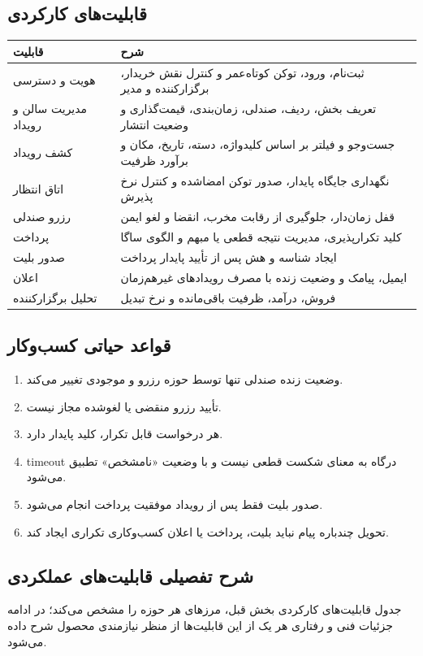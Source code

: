 \documentclass[12pt,a4paper]{article}
\newcommand{\term}[1]{\lr{#1}}
\begin{document}
\subsection{قابلیت‌های کارکردی}
\begin{center}
\begin{tabular}{P{3.3cm}P{10.8cm}}
\toprule
قابلیت & شرح\\
\midrule
هویت و دسترسی & ثبت‌نام، ورود، توکن کوتاه‌عمر و کنترل نقش خریدار، برگزارکننده و مدیر\\
مدیریت سالن و رویداد & تعریف بخش، ردیف، صندلی، زمان‌بندی، قیمت‌گذاری و وضعیت انتشار\\
کشف رویداد & جست‌وجو و فیلتر بر اساس کلیدواژه، دسته، تاریخ، مکان و برآورد ظرفیت\\
اتاق انتظار & نگهداری جایگاه پایدار، صدور توکن امضاشده و کنترل نرخ پذیرش\\
رزرو صندلی & قفل زمان‌دار، جلوگیری از رقابت مخرب، انقضا و لغو ایمن\\
پرداخت & کلید تکرارپذیری، مدیریت نتیجه قطعی یا مبهم و الگوی ساگا\\
صدور بلیت & ایجاد شناسه و هش \term{QR} پس از تأیید پایدار پرداخت\\
اعلان & ایمیل، پیامک و وضعیت زنده با مصرف رویدادهای غیرهم‌زمان\\
تحلیل برگزارکننده & فروش، درآمد، ظرفیت باقی‌مانده و نرخ تبدیل\\
\bottomrule
\end{tabular}
\end{center}

\subsection{قواعد حیاتی کسب‌وکار}
\begin{enumerate}
  \item وضعیت زنده صندلی تنها توسط حوزه رزرو و موجودی تغییر می‌کند.
  \item تأیید رزرو منقضی یا لغوشده مجاز نیست.
  \item هر درخواست قابل تکرار، کلید \term{Idempotency} پایدار دارد.
  \item timeout درگاه به معنای شکست قطعی نیست و با وضعیت «نامشخص» تطبیق می‌شود.
  \item صدور بلیت فقط پس از رویداد موفقیت پرداخت انجام می‌شود.
  \item تحویل چندباره پیام نباید بلیت، پرداخت یا اعلان کسب‌وکاری تکراری ایجاد کند.
\end{enumerate}

\subsection{شرح تفصیلی قابلیت‌های عملکردی}
جدول قابلیت‌های کارکردی بخش قبل، مرزهای هر حوزه را مشخص می‌کند؛ در ادامه
جزئیات فنی و رفتاری هر یک از این قابلیت‌ها از منظر نیازمندی محصول شرح داده
می‌شود.
\end{document}
